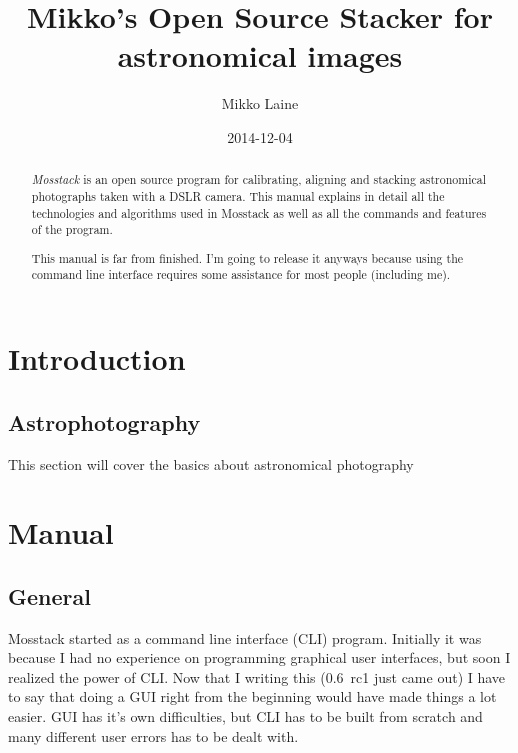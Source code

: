 \documentclass[twoside,a4paper]{refart}
\title{Mikko's Open Source Stacker for astronomical images}
\author{Mikko Laine}
\date{2014-12-04}
\begin{document}
\maketitle

\begin{abstract}
	\textit{Mosstack} is an open source program for calibrating,
	aligning and stacking astronomical photographs taken with a DSLR
	camera. This manual explains in detail all the technologies and
	algorithms used in Mosstack as well as all the commands and
	features of the program.
	
	This manual is far from finished. I'm going to release it anyways
	because using the command line interface requires some assistance
	for most people (including me). 
\end{abstract}



\tableofcontents

\newpage



\section{Introduction}


\subsection{Astrophotography}
\label{astrophotography}
This section will cover the basics about astronomical photography


\newpage

\section{Manual}
\label{manual}

\subsection{General}

Mosstack started as a command line interface (CLI) program. Initially it was because I had no experience on programming
graphical user interfaces, but soon I realized the power of CLI. Now that I writing this (0.6~rc1 just came out) I have 
to say that doing a GUI right from the beginning would have made things a lot easier. GUI has it's own difficulties, but
CLI has to be built from scratch and many different user errors has to be dealt with.
\end{document}

